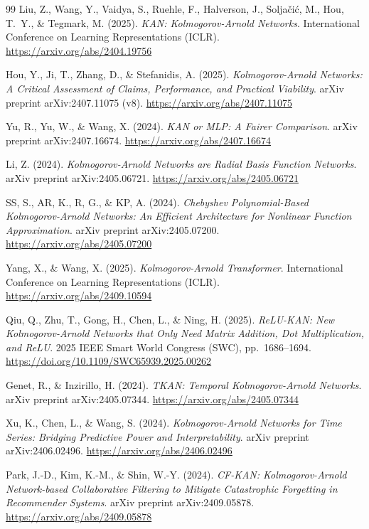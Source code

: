 \begin{thebibliography}{99}
Liu, Z., Wang, Y., Vaidya, S., Ruehle, F., Halverson, J., Solja\v{c}i\'{c}, M., Hou, T.~Y., \& Tegmark, M. (2025).
\textit{KAN: Kolmogorov-Arnold Networks}.
International Conference on Learning Representations (ICLR). \url{https://arxiv.org/abs/2404.19756}

Hou, Y., Ji, T., Zhang, D., \& Stefanidis, A. (2025).
\textit{Kolmogorov-Arnold Networks: A Critical Assessment of Claims, Performance, and Practical Viability}.
arXiv preprint arXiv:2407.11075 (v8). \url{https://arxiv.org/abs/2407.11075}

Yu, R., Yu, W., \& Wang, X. (2024).
\textit{KAN or MLP: A Fairer Comparison}.
arXiv preprint arXiv:2407.16674. \url{https://arxiv.org/abs/2407.16674}

Li, Z. (2024).
\textit{Kolmogorov-Arnold Networks are Radial Basis Function Networks}.
arXiv preprint arXiv:2405.06721. \url{https://arxiv.org/abs/2405.06721}

SS, S., AR, K., R, G., \& KP, A. (2024).
\textit{Chebyshev Polynomial-Based Kolmogorov-Arnold Networks: An Efficient Architecture for Nonlinear Function Approximation}.
arXiv preprint arXiv:2405.07200. \url{https://arxiv.org/abs/2405.07200}

Yang, X., \& Wang, X. (2025).
\textit{Kolmogorov-Arnold Transformer}.
International Conference on Learning Representations (ICLR). \url{https://arxiv.org/abs/2409.10594}

Qiu, Q., Zhu, T., Gong, H., Chen, L., \& Ning, H. (2025).
\textit{ReLU-KAN: New Kolmogorov-Arnold Networks that Only Need Matrix Addition, Dot Multiplication, and ReLU}.
2025 IEEE Smart World Congress (SWC), pp.\ 1686--1694. \url{https://doi.org/10.1109/SWC65939.2025.00262}

Genet, R., \& Inzirillo, H. (2024).
\textit{TKAN: Temporal Kolmogorov-Arnold Networks}.
arXiv preprint arXiv:2405.07344. \url{https://arxiv.org/abs/2405.07344}

Xu, K., Chen, L., \& Wang, S. (2024).
\textit{Kolmogorov-Arnold Networks for Time Series: Bridging Predictive Power and Interpretability}.
arXiv preprint arXiv:2406.02496. \url{https://arxiv.org/abs/2406.02496}

Park, J.-D., Kim, K.-M., \& Shin, W.-Y. (2024).
\textit{CF-KAN: Kolmogorov-Arnold Network-based Collaborative Filtering to Mitigate Catastrophic Forgetting in Recommender Systems}.
arXiv preprint arXiv:2409.05878. \url{https://arxiv.org/abs/2409.05878}


\end{thebibliography}
